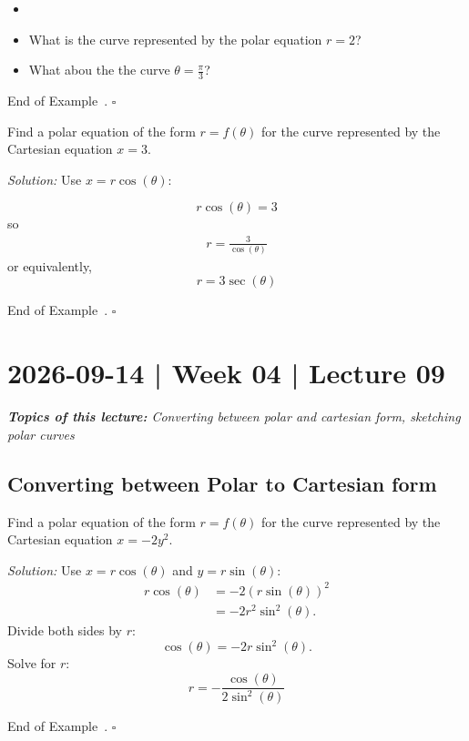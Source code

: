 \documentclass[10pt]{article}
\theoremstyle{definition}
\newtheorem{example}[theorem]{Example}
\renewenvironment{example}
{\begin{oldexample}}
  {\par\smallskip\hfill   End of Example~\theexample. $\square$    \par\end{oldexample}}
\newcommand{\Fli}{\vskip 2mm\noindent\textit} %
\newcommand{\1}[1]{\textbf{1}_{\left[#1\right]}} %
\begin{document}
\begin{example}
  \begin{itemize}
    \item []
    \item What is the curve represented by the polar equation $r=2$?
    \item What abou the the curve $\theta = \frac{\pi}{3}$?
  \end{itemize}
\end{example}
\begin{example}
  Find a polar equation of the form $r=f(\theta)$ for the
  curve represented by the Cartesian equation $x=3$.

  \Fli{Solution:} Use $x=r\cos(\theta)$:

  \begin{equation*}
    r\cos(\theta) = 3
  \end{equation*}
  so
  \begin{align*}
    r = \frac{3}{\cos(\theta)} 
  \end{align*}
  or equivalently,
  \begin{equation*}
    r = 3\sec(\theta)
  \end{equation*}
\end{example}

\newpage
\section{2026-09-14 | Week 04 | Lecture 09}
\begin{center}
  \begin{tcolorbox}[width=0.9\textwidth, colback=white, colframe=black]
    \textit{\textbf{Topics of this lecture:} Converting between polar and
      cartesian form, sketching polar curves}
  \end{tcolorbox}
\end{center}

\subsection{Converting between Polar to Cartesian form}
\begin{example}[Cartesian $\implies$ Polar ]
  Find a polar equation of the form $r = f(\theta)$ for the
  curve represented by the Cartesian equation $x=-2y^{2}$.

  \Fli{Solution:} Use
  $x=r\cos(\theta)$ and $y=r\sin(\theta)$:
  \begin{align*}
    r\cos(\theta) 
    &= -2 \left( r\sin(\theta) \right)^{2}\\
    &= -2 r^{2}\sin^{2}(\theta).
  \end{align*}
  Divide both sides by $r$:
  \begin{equation*}
    \cos(\theta) = -2r \sin^{2}(\theta).
  \end{equation*}
  Solve for $r$:
  \begin{equation*}
    r = -\frac{\cos(\theta)}{2\sin^{2}(\theta)}
  \end{equation*}
\end{example}
\end{document}

